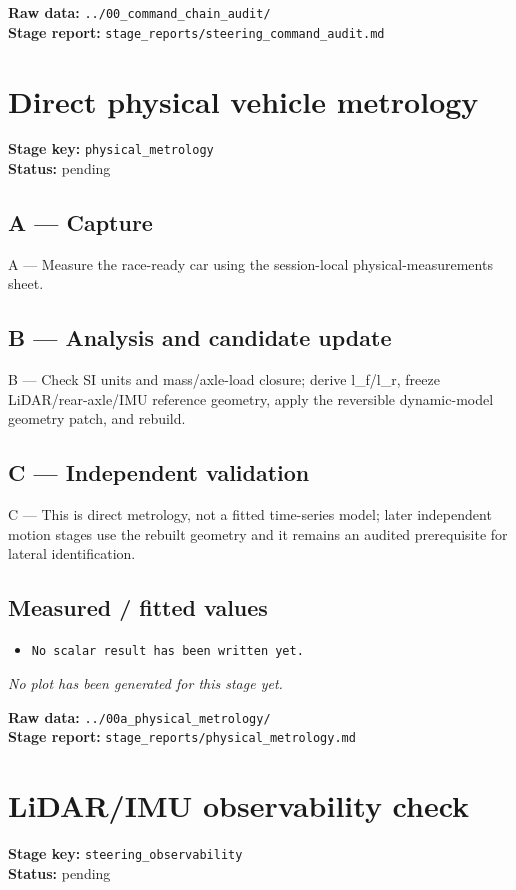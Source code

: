 \documentclass[11pt,a4paper]{article}
\begin{document}
\vfill
\textbf{Raw data:} \texttt{../00\_command\_chain\_audit/}\\
\textbf{Stage report:} \texttt{stage\_reports/steering\_command\_audit.md}
\clearpage
\small
\section*{Direct physical vehicle metrology}
\textbf{Stage key:} \texttt{physical\_metrology}\\
\textbf{Status:} pending\\

\subsection*{A --- Capture}
A — Measure the race-ready car using the session-local physical-measurements sheet.

\subsection*{B --- Analysis and candidate update}
B — Check SI units and mass/axle-load closure; derive l\_f/l\_r, freeze LiDAR/rear-axle/IMU reference geometry, apply the reversible dynamic-model geometry patch, and rebuild.

\subsection*{C --- Independent validation}
C — This is direct metrology, not a fitted time-series model; later independent motion stages use the rebuilt geometry and it remains an audited prerequisite for lateral identification.

\subsection*{Measured / fitted values}
\begin{itemize}\setlength\itemsep{0pt}
\item \texttt{No scalar result has been written yet.}
\end{itemize}

\textit{No plot has been generated for this stage yet.}

\vfill
\textbf{Raw data:} \texttt{../00a\_physical\_metrology/}\\
\textbf{Stage report:} \texttt{stage\_reports/physical\_metrology.md}
\clearpage
\small
\section*{LiDAR/IMU observability check}
\textbf{Stage key:} \texttt{steering\_observability}\\
\textbf{Status:} pending\\
\end{document}
